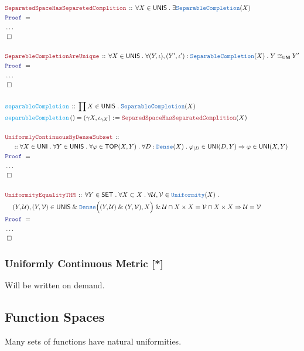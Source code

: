 \documentclass[12pt]{scrartcl}
\newcommand{\TYPE}[1]{\textcolor{NavyBlue}{\mathtt{#1}}}
\newcommand{\FUNC}[1]{\textcolor{Cerulean}{\mathtt{#1}}}
\newcommand{\LOGIC}[1]{\textcolor{Blue}{\mathtt{#1}}}
\newcommand{\THM}[1]{\textcolor{Maroon}{\mathtt{#1}}}
\renewcommand{\.}{\; . \;}
\newcommand{\de}{: \kern 0.1pc =}
\newcommand{\Act}[1]{\left( #1 \right)}
\newcommand{\Theorem}[2]{& \THM{#1} \, :: \, #2 \\ & \Proof = \\ }
\newcommand{\DeclareFunc}[2]{& \FUNC{#1} \, :: \, #2 \\}
\newcommand{\DefineNamedFunc}[4]{&  \FUNC{#1}\Act{#2} = #3 \de #4 \\}
\newcommand{\NewLine}{\\ & \kern 1pc}
\newcommand{\Page}[1]{ \begin{align*} #1 \end{align*}   }
\newcommand{\NoProof}{ & \ldots \\ \EndProof}
\renewcommand{\And}{\; \& \;}
\newcommand{\Imply}{\Rightarrow}
\newcommand{\QED}{\; \square}
\newcommand{\EndProof}{& \QED \\}
\newcommand{\Proof}{\LOGIC{Proof} \; }
\newcommand{\SET}{\mathsf{SET}}
\newcommand{\Dense}{\TYPE{Dense}}
\newcommand{\TOP}{\mathsf{TOP}}
\renewcommand{\U}{\mathcal{U}}
\newcommand{\UNI}{\mathsf{UNI}}
\newcommand{\UNIS}{\mathsf{UNIS}}
\newcommand{\Unif}{\TYPE{Uniformity}}
\newcommand{\SCompletion}{\TYPE{SeparableCompletion}}
\newcommand{\V}{\mathcal{V}}
\begin{document}
\Page{
	\Theorem{SeparatedSpaceHasSeparetedComplition}
	{
		\forall X \in \UNIS \.
		\exists \SCompletion(X)
	}
	\NoProof
	\\
	\Theorem{SeparebleCompletionAreUnique}
	{
		\forall X \in \UNIS \.
		\forall (Y,\iota),(Y',\iota') :  \SCompletion(X) \.
		Y \cong_\UNI Y'
	}
	\NoProof
	\\
	\DeclareFunc{separableCompletion}
	{
		\prod X \in \UNIS \.
		\SCompletion(X)
	}
	\DefineNamedFunc{separableCompletion}{}{(\gamma X,\iota_{\gamma X})}
	{
		\THM{SeparedSpaceHasSeparatedComplition}(X)
	}
	\\
	\Theorem{UniformlyContinuousByDenseSubset}
	{
		\NewLine ::
		\forall X \in \UNI \.
		\forall Y \in \UNIS \.
		\forall \varphi \in \TOP(X,Y) \.
		\forall D : \TYPE{Dense}(X) \.
		\varphi_{|D} \in \UNI(D,Y) 
		\Imply
		\varphi \in \UNI(X,Y) 
	}
	\NoProof
	\\
	\Theorem{UniformityEqualityTHM}
	{
		\forall Y \in \SET \.
		\forall X \subset X \.
		\forall \U,\V \in \Unif(X) \. \NewLine
		(Y,\U),(Y,\V) \in \UNIS \And 
		\Dense\Big( (Y,\U) \And (Y,\V), X\Big)
		\And \U \cap X \times X = \V \cap X \times X
		\Imply
		\U = \V
	}
	\NoProof
}
\newpage
\subsubsection{Uniformly Continuous Metric [*]}
Will be written on demand.
\newpage
\subsection{Function Spaces}
Many sets of functions have natural uniformities.
\end{document}
